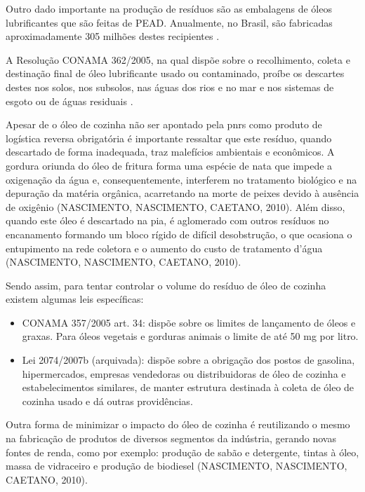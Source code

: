 \begin{description}
	Outro dado importante na produção de resíduos são as embalagens de óleos lubrificantes que são feitas de PEAD. Anualmente, no Brasil, são fabricadas aproximadamente 305 milhões destes recipientes \cite{IPEA2012d}.
	
	A Resolução CONAMA 362/2005, na qual dispõe sobre o recolhimento, coleta e destinação final de óleo lubrificante usado ou contaminado, proíbe os descartes destes nos solos, nos subsolos, nas águas dos rios e no mar e nos sistemas de esgoto ou de águas residuais \cite{conama:362}.
	
	Apesar de o óleo de cozinha não ser apontado pela \gls{pnrs} como produto de logística reversa obrigatória é importante ressaltar que este resíduo, quando descartado de forma inadequada, traz malefícios ambientais e econômicos. A gordura oriunda do óleo de fritura forma uma espécie de nata que impede a oxigenação da água e, consequentemente, interferem no tratamento biológico e na depuração da matéria orgânica, acarretando na morte de peixes devido à ausência de oxigênio (NASCIMENTO, NASCIMENTO, CAETANO, 2010). Além disso, quando este óleo é descartado na pia, é aglomerado com outros resíduos no encanamento formando um bloco rígido de difícil desobstrução, o que ocasiona o entupimento na rede coletora e o aumento do custo de tratamento d’água (NASCIMENTO, NASCIMENTO, CAETANO, 2010). 
	
	Sendo assim, para tentar controlar o volume do resíduo de óleo de cozinha existem algumas leis específicas: 
	
	\begin{itemize}
		\item CONAMA 357/2005 art. 34: dispõe sobre os limites de lançamento de óleos e graxas. Para óleos vegetais e gorduras animais o limite de até 50 mg por litro.
		\item Lei 2074/2007b (arquivada): dispõe sobre a obrigação dos postos de gasolina, hipermercados, empresas vendedoras ou distribuidoras de óleo de cozinha e estabelecimentos similares, de manter estrutura destinada à coleta de óleo de cozinha usado e dá outras providências. 
	\end{itemize}
	
	Outra forma de minimizar o impacto do óleo de cozinha é reutilizando o mesmo na fabricação de produtos de diversos segmentos da indústria, gerando novas fontes de renda, como por exemplo: produção de sabão e detergente, tintas à óleo, massa de vidraceiro e produção de biodiesel (NASCIMENTO, NASCIMENTO, CAETANO, 2010).
	

\end{description}
